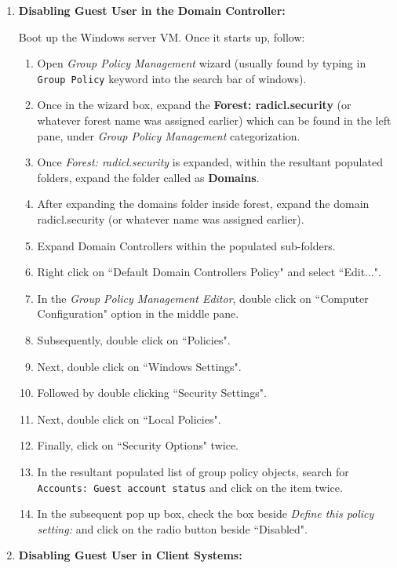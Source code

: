 \documentclass[12pt]{extarticle}
\begin{document}
\begin{enumerate}
	\item \textbf{Disabling Guest User in the Domain Controller:}
	
	Boot up the Windows server VM. Once it starts up, follow:
	
	\begin{enumerate}
		\item Open \textit{Group Policy Management} wizard (usually found by typing in \texttt{Group Policy} keyword into the search bar of windows).
		\item Once in the wizard box, expand the \textbf{Forest: radicl.security} (or whatever forest name was assigned earlier) which can be found in the left pane, under \textit{Group Policy Management} categorization.
		\item Once \textit{Forest: radicl.security} is expanded, within the resultant populated folders, expand the folder called as \textbf{Domains}.
		\item After expanding the domains folder inside forest, expand the domain radicl.security (or whatever name was assigned earlier).
		\item Expand Domain Controllers within the populated sub-folders.
		\item Right click on ``Default Domain Controllers Policy" and select ``Edit...".
		\item In the \textit{Group Policy Management Editor}, double click on ``Computer Configuration" option in the middle pane.
		\item Subsequently, double click on ``Policies".
		\item Next, double click on ``Windows Settings".
		\item Followed by double clicking ``Security Settings".
		\item Next, double click on ``Local Policies".
		\item Finally, click on ``Security Options" twice.
		\item In the resultant populated list of group policy objects, search for \texttt{Accounts: Guest account status} and click on the item twice.
		\item In the subsequent pop up box, check the box beside \textit{Define this policy setting:} and click on the radio button beside ``Disabled". 
	\end{enumerate}
	
	
	
	\item \textbf{Disabling Guest User in Client Systems:}


\end{enumerate}
\end{document}
